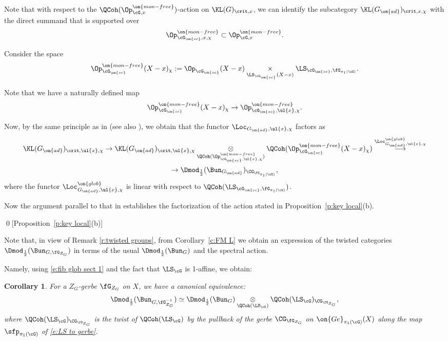 \documentclass[9pt]{amsart}
\newtheorem{cor}[subsubsection]{Corollary}
\theoremstyle{remark}
\theoremstyle{definition}
\theoremstyle{remark}
\newcommand{\propref}[1]{Proposition~\ref{#1}}
\newcommand{\corref}[1]{Corollary~\ref{#1}}
\numberwithin{equation}{section}
\begin{document}
\medskip

Note that with respect to the $\QCoh(\Op^{\on{mon-free}}_{\cG,x})$-action on $\KL(G)_{\crit,x}$, we can identify the subcategory $\KL(G_{\on{ad}})_{\crit,x,\chi}$
with the direct summand that is supported over
$$\Op^{\on{mon-free}}_{\cG_{\on{sc}},x,\chi}\subset \Op^{\on{mon-free}}_{\cG,x}.$$

\sssec{}

Consider the space
$$\Op^{\on{mon-free}}_{\cG_{\on{sc}}}(X-x)_\chi:=
\Op_{\cG_{\on{sc}}}(X-x)\underset{\LS_{\cG_{\on{sc}}}(X-x)}\times \LS_{\cG_{\on{sc}},\fG_{\pi_1(\cG)}}.$$

Note that we have a naturally defined map
$$\Op^{\on{mon-free}}_{\cG_{\on{sc}}}(X-x)_\chi\to \Op^{\on{mon-free}}_{\cG_{\on{sc}},\ul{x},\chi}.$$

Now, by the same principle as in \cite[Theorem 10.3.4]{Ga4} (see also \cite[Sects. 15-16]{GLC2}), 
we obtain that the functor $\Loc_{G_{\on{ad}},\ul{x},\chi}$ factors as
\begin{multline*} 
\KL(G_{\on{ad}})_{\crit,\ul{x},\chi}\to
\KL(G_{\on{ad}})_{\crit,\ul{x},\chi}\underset{\QCoh(\Op^{\on{mon-free}}_{\cG_{\on{sc}},\ul{x},\chi})}\otimes
\QCoh(\Op^{\on{mon-free}}_{\cG_{\on{sc}}}(X-x)_\chi)\overset{\Loc^{\on{glob}}_{G_{\on{ad}},\ul{x},\chi}}\longrightarrow \\
\to \Dmod_{\frac{1}{2}}(\Bun_{G_{\on{ad}}})_{\CG_{\fG_{\pi_1(\cG)}}},
\end{multline*}
where the functor $\Loc^{\on{glob}}_{G_{\on{ad}},\ul{x},\chi}$ is linear with respect to
$\QCoh(\LS_{\cG_{\on{sc}},\fG_{\pi_1(\cG)}})$. 

\medskip

Now the argument parallel to that in \cite[Sect. 11.1]{Ga4} establishes the factorization of the action stated in \propref{p:key local}(b). 

\qed[\propref{p:key local}(b)]


\sssec{}

Note that, in view of Remark \ref{r:twisted groups}, from \corref{c:FM L} we obtain an expression of the twisted categories 
$\Dmod_{\frac{1}{2}}(\Bun_{G,\fG_{Z_G}})$ in terms of the usual $\Dmod_{\frac{1}{2}}(\Bun_{G})$ and the spectral action. 

\medskip

Namely, using \eqref{e:fib glob sect 1} and the fact that $\LS_\cG$ is 1-affine, we obtain:

\begin{cor} \label{c:twisted BunG}
For a $Z_G$-gerbe $\fG_{Z_G}$ on $X$, we have a canonical equivalence: 
$$\Dmod_{\frac{1}{2}}(\Bun_{G,\fG^{-1}_{Z_G}}) \simeq
\Dmod_{\frac{1}{2}}(\Bun_{G})\underset{\QCoh(\LS_\cG)}\otimes \QCoh(\LS_\cG)_{\CG_{\fG_{Z_G}}},$$
where $\QCoh(\LS_\cG)_{\CG_{\fG_{Z_G}}}$ is the twist of $\QCoh(\LS_\cG)$ by the pullback of the gerbe $\CG_{\fG_{Z_G}}$
on $\on{Ge}_{\pi_1(\cG)}(X)$ along the map $\sfp_{\pi_1(\cG)}$ of \eqref{e:LS to gerbe}. 
\end{cor} 
\end{document}
